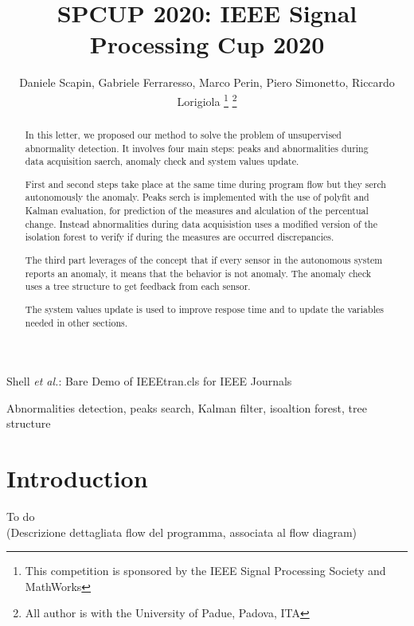 \documentclass[journal]{IEEEtran}
\begin{document}
\title{SPCUP 2020: IEEE Signal Processing Cup 2020}

\author{Daniele Scapin, Gabriele Ferraresso, Marco Perin, Piero Simonetto, Riccardo Lorigiola
\thanks{This competition is sponsored by the IEEE Signal Processing Society and MathWorks}
\thanks{All author is with the University of Padue, Padova, ITA}}

{Shell \MakeLowercase{\textit{et al.}}: Bare Demo of IEEEtran.cls for IEEE Journals}
\maketitle

\begin{abstract}
In this letter, we proposed our method to solve the problem of unsupervised abnormality detection.
It involves four main steps: peaks and abnormalities during data acquisition saerch, anomaly check and system values update.

First and second steps take place at the same time during program flow but they serch autonomously the anomaly.
Peaks serch is implemented with the use of polyfit and Kalman evaluation, for prediction of the measures and 
alculation of the percentual change. Instead abnormalities during data acquisistion uses a modified version
of the isolation forest to verify if during the measures are occurred discrepancies.

The third part leverages of the concept that if every sensor in the autonomous system reports an anomaly, it means that
the behavior is not anomaly. The anomaly check uses a tree structure to get feedback from each sensor.

The system values update is used to improve respose time and to update the variables needed in other sections.
\end{abstract}

\begin{IEEEkeywords}
Abnormalities detection, peaks search, Kalman filter, isoaltion forest, tree structure
\end{IEEEkeywords}

\IEEEpeerreviewmaketitle{}

\section{Introduction}

\IEEEPARstart{}
{To do}
\\(Descrizione dettagliata flow del programma, associata al flow diagram)
\end{document}
